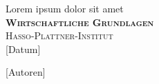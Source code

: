 \begin{titlepage}
    \begin{center}
	\vspace*{1cm}
    \huge \textsf{Lorem ipsum dolor sit amet} \\
    \vspace{2cm}
	\Large\textbf{\textsc{Wirtschaftliche Grundlagen}}\\
    \vspace{1cm}
	\Large\textsc{Hasso-Plattner-Institut}\\
    \normalsize
	[Datum]
	
	\vspace{10cm}

	\large [Autoren]
	\normalsize
    \end{center}
 \normalsize{

 }
\end{titlepage}
